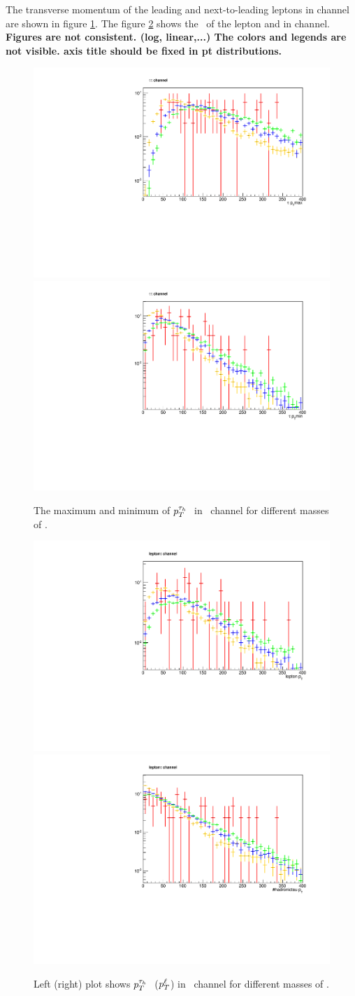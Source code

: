 The transverse momentum of the leading and next-to-leading \Tau leptons in \tauTau channel are shown in figure \ref{fig:pt-hh}. The figure \ref{fig:pt-lh} shows the \pt ~of the lepton and \Tau in \lepTau channel.
{\bf Figures are not consistent. (log, linear,...) The colors and legends are not visible. axis title should be fixed in pt distributions.}
\begin{figure}[!ht]
\centering
\includegraphics*[width=.45\textwidth]{figs/Pt_hh_max.pdf}
\hspace{3mm}
\includegraphics*[width=.45\textwidth]{figs/Pt_hh_min.pdf}
\caption{The maximum  and minimum of $p_T^{\tau_h~}$ in \tauTau ~channel for different masses of \wprime.}
\label{fig:pt-hh}
\end{figure}
\begin{figure}[!ht]
\centering
\includegraphics*[width=.45\textwidth]{figs/Pt_lh_tau.pdf}
\hspace{3mm}
\includegraphics*[width=.45\textwidth]{figs/Pt_lh_lep.pdf}
\caption{Left (right) plot shows $p_T^{\tau_h~}$ ($p_T^{\ell}$) in \lepTau ~channel for different masses of \wprime.}
\label{fig:pt-lh}
\end{figure}

  

